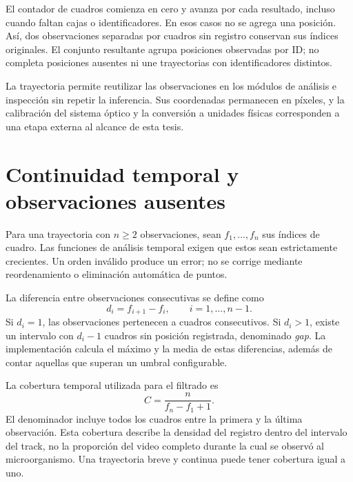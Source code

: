 El contador de cuadros comienza en cero y avanza por cada resultado, incluso cuando faltan cajas o identificadores. En esos casos no se agrega una posición. Así, dos observaciones separadas por cuadros sin registro conservan sus índices originales. El conjunto resultante agrupa posiciones observadas por ID; no completa posiciones ausentes ni une trayectorias con identificadores distintos.

La trayectoria permite reutilizar las observaciones en los módulos de análisis e inspección sin repetir la inferencia. Sus coordenadas permanecen en píxeles, y la calibración del sistema óptico y la conversión a unidades físicas corresponden a una etapa externa al alcance de esta tesis.

\section{Continuidad temporal y observaciones ausentes}

Para una trayectoria con $n\geq2$ observaciones, sean $f_1,\ldots,f_n$ sus índices de cuadro. Las funciones de análisis temporal exigen que estos sean estrictamente crecientes. Un orden inválido produce un error; no se corrige mediante reordenamiento o eliminación automática de puntos.

La diferencia entre observaciones consecutivas se define como
\begin{equation}
  d_i=f_{i+1}-f_i,\qquad i=1,\ldots,n-1.
\end{equation}
Si $d_i=1$, las observaciones pertenecen a cuadros consecutivos. Si $d_i>1$, existe un intervalo con $d_i-1$ cuadros sin posición registrada, denominado \textit{gap}. La implementación calcula el máximo y la media de estas diferencias, además de contar aquellas que superan un umbral configurable.

La cobertura temporal utilizada para el filtrado es
\begin{equation}
  C=\frac{n}{f_n-f_1+1}.
  \label{eq:cobertura-track}
\end{equation}
El denominador incluye todos los cuadros entre la primera y la última observación. Esta cobertura describe la densidad del registro dentro del intervalo del track, no la proporción del video completo durante la cual se observó al microorganismo. Una trayectoria breve y continua puede tener cobertura igual a uno.

